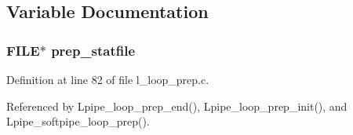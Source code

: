 \subsection{Variable Documentation}
\subsubsection{\setlength{\rightskip}{0pt plus 5cm}FILE$\ast$ \bf{prep\_\-statfile}\hspace{0.3cm}{\tt  [static]}}\label{l__loop__prep_8c_57718bd8c073acf3763a16adc4ce7d14}




Definition at line 82 of file l\_\-loop\_\-prep.c.

Referenced by Lpipe\_\-loop\_\-prep\_\-end(), Lpipe\_\-loop\_\-prep\_\-init(), and Lpipe\_\-softpipe\_\-loop\_\-prep().